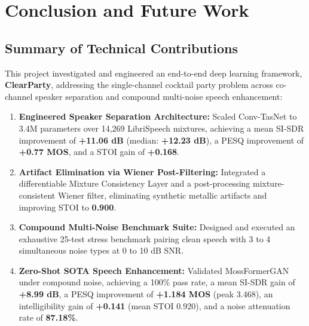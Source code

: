 \documentclass[11pt,a4paper]{report}
\begin{document}
\chapter{Conclusion and Future Work}
\label{chap:conclusion}

\section{Summary of Technical Contributions}
This project investigated and engineered an end-to-end deep learning framework, \textbf{ClearParty}, addressing the single-channel cocktail party problem across co-channel speaker separation and compound multi-noise speech enhancement:
\begin{enumerate}
    \item \textbf{Engineered Speaker Separation Architecture:} Scaled Conv-TasNet to 3.4M parameters over 14,269 LibriSpeech mixtures, achieving a mean SI-SDR improvement of \textbf{+11.06 dB} (median: \textbf{+12.23 dB}), a PESQ improvement of \textbf{+0.77 MOS}, and a STOI gain of \textbf{+0.168}.
    \item \textbf{Artifact Elimination via Wiener Post-Filtering:} Integrated a differentiable Mixture Consistency Layer and a post-processing mixture-consistent Wiener filter, eliminating synthetic metallic artifacts and improving STOI to \textbf{0.900}.
    \item \textbf{Compound Multi-Noise Benchmark Suite:} Designed and executed an exhaustive 25-test stress benchmark pairing clean speech with 3 to 4 simultaneous noise types at 0 to 10 dB SNR.
    \item \textbf{Zero-Shot SOTA Speech Enhancement:} Validated MossFormerGAN under compound noise, achieving a 100\% pass rate, a mean SI-SDR gain of \textbf{+8.99 dB}, a PESQ improvement of \textbf{+1.184 MOS} (peak 3.468), an intelligibility gain of \textbf{+0.141} (mean STOI 0.920), and a noise attenuation rate of \textbf{87.18\%}.
\end{enumerate}
\end{document}
